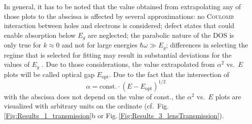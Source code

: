 In general, it has to be noted that the value obtained from extrapolating any of those plots to the abscissa is affected by several approximations:
    no \textsc{Coulomb} interaction between holes and electrons is considered;
    defect states that could enable absorption below $E_g$ are neglected;
    the parabolic nature of the \gls{DOS} is only true for $k\approx0$ and not for large energies $\hbar\omega\gg E_g$;
    differences in selecting the regime that is selected for fitting may result in substantial deviations for the values of $E_g$
    \cite{zanatta2019}.
Due to those considerations, the value extrapolated from $\alpha^2$ vs.\ $E$ plots will be called optical gap $E_\mathrm{opt}$.
Due to the fact that the intersection of 
\begin{equation*}
    \alpha=\mathrm{const.}\cdot(E-E_\mathrm{opt})^{1/2}
\end{equation*}
with the abscissa does not depend on the value of $\mathrm{const.}$, the $\alpha^2$ vs.\ $E$ plots are visualized with arbitrary units on the ordinate (cf.\ Fig.\,\ref{Fig:Results_1_transmission}b or Fig.\,\ref{Fig:Results_3_lensTransmission}).